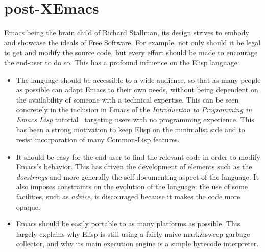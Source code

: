 \documentclass[format=acmsmall, review=false, screen=true]{acmart}
\newcommand \Elisp {Elisp}
\begin{document}
\section{post-XEmacs}           %


Emacs being the brain child of Richard Stallman, its design strives to
embody and showcase the ideals of Free Software.  For example, not only
should it be legal to get and modify the source code, but every effort
should be made to encourage the end-user to do so.  This has a profound
influence on the \Elisp{} language:
\begin{itemize}
\item The language should be accessible to a wide audience, so that as many
  people as possible can adapt Emacs to their own needs, without being
  dependent on the availability of someone with a technical expertise.
  This can be seen concretely in the inclusion in Emacs of the
  \emph{Introduction to Programming in Emacs Lisp}
  tutorial~\citep{ElispIntro} targeting users with no programming
  experience.  This has been a strong motivation to keep \Elisp{} on the
  minimalist side and to resist incorporation of many Common-Lisp features.
\item It should be easy for the end-user to find the relevant code in order
  to modify Emacs's behavior.   This has driven the development of elements
  such as the \emph{docstrings} and more generally the self-documenting
  aspect of the language.  It also imposes constraints on the evolution of
  the language: the use of some facilities, such as \emph{advice}, is
  discouraged because it makes the code more opaque.
\item Emacs should be easily portable to as many platforms as possible.
  This largely explains why \Elisp{} is still using a fairly naive
  mark\&sweep garbage collector, and why its main execution engine is
  a simple bytecode interpreter.
\end{itemize}


\end{document}
